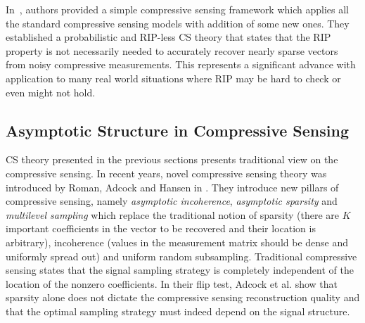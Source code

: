 \documentclass[journal]{IEEEtran}
\begin{document}
In~\cite{Candes2011}, authors provided a simple compressive sensing framework which applies all the standard compressive sensing models with addition of some new ones. They established a probabilistic and RIP-less CS theory that states that the RIP property is not necessarily needed to accurately recover nearly sparse vectors from noisy compressive measurements. This represents a significant advance with application to many real world situations where RIP may be hard to check or even might not hold.

\subsection{Asymptotic Structure in Compressive Sensing}
CS theory presented in the previous sections presents traditional view on the compressive sensing. In recent years, novel compressive sensing theory was introduced by Roman, Adcock and Hansen in \cite{Adcock2013, Adcock2015, Roman2014, Adcock}. They introduce new pillars of compressive sensing, namely \textit{asymptotic incoherence}, \textit{asymptotic sparsity} and \textit{multilevel sampling} which replace the traditional notion of sparsity (there are $K$ important coefficients in the vector to be recovered and their location is arbitrary), incoherence (values in the measurement matrix should be dense and uniformly spread out) and uniform random subsampling. Traditional compressive sensing states that the signal sampling strategy is completely independent of the location of the nonzero coefficients. In their flip test, Adcock et al. show that sparsity alone does not dictate the compressive sensing reconstruction quality and that the optimal sampling strategy must indeed depend on the signal structure.
\end{document}
